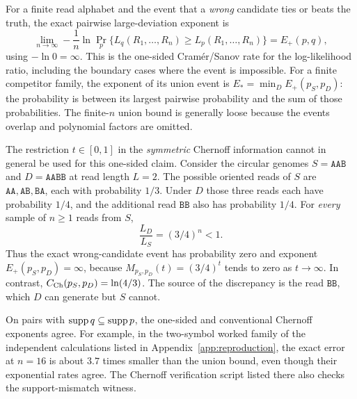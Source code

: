 \begin{remark}
\label{rem:chernoff-sharp}
For a finite read alphabet and the event that a \emph{wrong} candidate
ties or beats the truth, the exact pairwise large-deviation exponent is
\[
 \lim_{n\to\infty}-\frac1n\ln
   \Pr_p\{L_q(R_1,\ldots,R_n)\ge L_p(R_1,\ldots,R_n)\}
 = E_+(p,q),
\]
using $-\ln0=\infty$. This is the one-sided Cram\'er/Sanov rate
for the log-likelihood ratio, including the boundary cases where
the event is impossible. For a finite competitor family, the exponent
of its union event is $E_*=\min_D E_+(p_S,p_D)$:
the probability is between its largest pairwise probability and the
sum of those probabilities. The finite-$n$ union bound is generally
loose because the events overlap and polynomial factors are omitted.

The restriction $t\in[0,1]$ in the \emph{symmetric} Chernoff
information cannot in general be used for this one-sided claim.
Consider the circular genomes
$S=\texttt{AAB}$ and $D=\texttt{AABB}$ at read length $L=2$.
The possible oriented reads of $S$ are
$\texttt{AA},\texttt{AB},\texttt{BA}$, each with probability $1/3$.
Under $D$ those three reads each have probability $1/4$, and
the additional read $\texttt{BB}$ also has probability $1/4$.
For \emph{every} sample of $n\ge1$ reads from $S$,
\[
 \frac{L_D}{L_S}=(3/4)^n<1.
\]
Thus the exact wrong-candidate event has probability zero and exponent
$E_+(p_S,p_D)=\infty$, because $M_{p_S,p_D}(t)=(3/4)^t$ tends
to zero as $t\to\infty$. In contrast,
$C_{\rm Ch}(p_S,p_D)=\ln(4/3)$.
The source of the discrepancy is the read $\texttt{BB}$, which
$D$ can generate but $S$ cannot.

On pairs with $\operatorname{supp} q\subseteq\operatorname{supp} p$, the one-sided and
conventional Chernoff exponents agree. For example, in the two-symbol worked family of the independent calculations
listed in Appendix~\ref{app:reproduction}, the exact error at $n=16$
is about $3.7$ times smaller than the union bound, even though their
exponential rates agree. The Chernoff verification script listed
there also checks the support-mismatch witness.
\end{remark}

